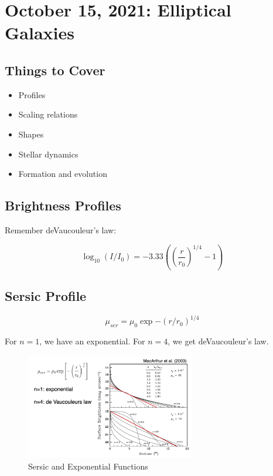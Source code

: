 \documentclass{article}
\begin{document}
\section{October 15, 2021: Elliptical Galaxies}

\subsection{Things to Cover}

\begin{itemize}
    \item Profiles
    \item Scaling relations
    \item Shapes
    \item Stellar dynamics
    \item Formation and evolution
\end{itemize}

\subsection{Brightness Profiles}

Remember deVaucouleur's law:

\begin{equation}
    \log_{10}\left(I/I_0\right) = -3.33\left(\left(\frac{r}{r_0}\right)^{1/4}-1\right)
\end{equation}

\subsection{Sersic Profile}

\begin{equation}
    \mu_{ser} = \mu_0 \exp{-\left(r/r_0\right)^{1/4}}
\end{equation}

For $n=1$, we have an exponential. For $n=4$, we get deVaucouleur's law. 

\begin{figure}
    \centering
\includegraphics[width=0.66\textwidth]{figs/Screen Shot 2021-10-15 at 9.59.34 AM.png}
    \caption{Sersic and Exponential Functions }
    \label{fig:sers_exp}
\end{figure}
\end{document}
